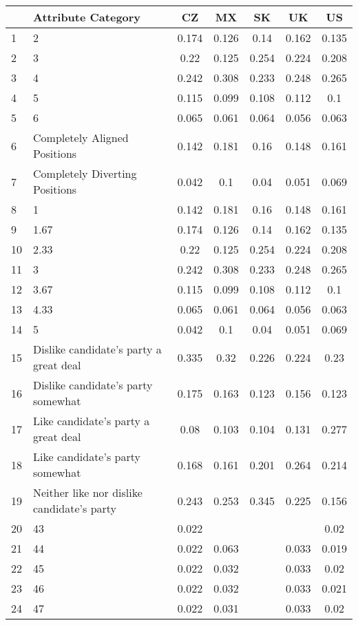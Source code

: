\begin{longtable}{lp{7cm}ccccc}
  \toprule
 & Attribute Category & CZ & MX & SK & UK & US \\ 
  \midrule
1 & 2 & 0.174 & 0.126 & 0.14 & 0.162 & 0.135 \\ 
  2 & 3 & 0.22 & 0.125 & 0.254 & 0.224 & 0.208 \\ 
  3 & 4 & 0.242 & 0.308 & 0.233 & 0.248 & 0.265 \\ 
  4 & 5 & 0.115 & 0.099 & 0.108 & 0.112 & 0.1 \\ 
  5 & 6 & 0.065 & 0.061 & 0.064 & 0.056 & 0.063 \\ 
  6 & Completely Aligned Positions & 0.142 & 0.181 & 0.16 & 0.148 & 0.161 \\ 
  7 & Completely Diverting Positions & 0.042 & 0.1 & 0.04 & 0.051 & 0.069 \\ 
  8 & 1 & 0.142 & 0.181 & 0.16 & 0.148 & 0.161 \\ 
  9 & 1.67 & 0.174 & 0.126 & 0.14 & 0.162 & 0.135 \\ 
  10 & 2.33 & 0.22 & 0.125 & 0.254 & 0.224 & 0.208 \\ 
  11 & 3 & 0.242 & 0.308 & 0.233 & 0.248 & 0.265 \\ 
  12 & 3.67 & 0.115 & 0.099 & 0.108 & 0.112 & 0.1 \\ 
  13 & 4.33 & 0.065 & 0.061 & 0.064 & 0.056 & 0.063 \\ 
  14 & 5 & 0.042 & 0.1 & 0.04 & 0.051 & 0.069 \\ 
  15 & Dislike candidate's party a great deal & 0.335 & 0.32 & 0.226 & 0.224 & 0.23 \\ 
  16 & Dislike candidate's party somewhat & 0.175 & 0.163 & 0.123 & 0.156 & 0.123 \\ 
  17 & Like candidate's party a great deal & 0.08 & 0.103 & 0.104 & 0.131 & 0.277 \\ 
  18 & Like candidate's party somewhat & 0.168 & 0.161 & 0.201 & 0.264 & 0.214 \\ 
  19 & Neither like nor dislike candidate's party & 0.243 & 0.253 & 0.345 & 0.225 & 0.156 \\ 
  20 & 43 & 0.022 &  &  &  & 0.02 \\ 
  21 & 44 & 0.022 & 0.063 &  & 0.033 & 0.019 \\ 
  22 & 45 & 0.022 & 0.032 &  & 0.033 & 0.02 \\ 
  23 & 46 & 0.022 & 0.032 &  & 0.033 & 0.021 \\ 
  24 & 47 & 0.022 & 0.031 &  & 0.033 & 0.02 \\ 

\end{longtable}
